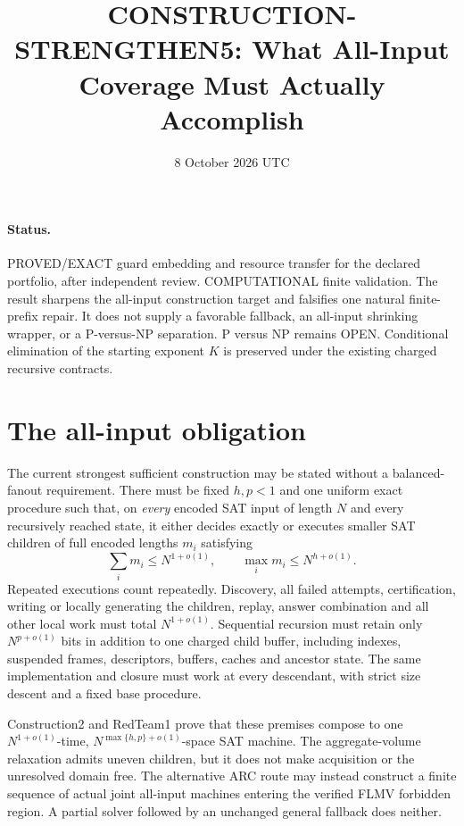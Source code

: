 \documentclass[11pt]{article}
\title{CONSTRUCTION-STRENGTHEN5: What All-Input Coverage Must Actually Accomplish}
\date{8 October 2026 UTC}
\begin{document}
\sloppy\maketitle

\paragraph{Status.}
PROVED/EXACT guard embedding and resource transfer for the declared
portfolio, after independent review. COMPUTATIONAL finite validation.
The result sharpens the all-input construction target and falsifies one
natural finite-prefix repair. It does not supply a favorable fallback,
an all-input shrinking wrapper, or a P-versus-NP separation. P versus NP
remains OPEN. Conditional elimination of the starting exponent $K$ is
preserved under the existing charged recursive contracts.

\section{The all-input obligation}
The current strongest sufficient construction may be stated without a
balanced-fanout requirement. There must be fixed $h,p<1$ and one uniform
exact procedure such that, on \emph{every} encoded SAT input of length
$N$ and every recursively reached state, it either decides exactly or
executes smaller SAT children of full encoded lengths $m_i$ satisfying
\[
 \sum_i m_i\le N^{1+o(1)},\qquad
 \max_i m_i\le N^{h+o(1)}.
 \tag{1}
\]
Repeated executions count repeatedly. Discovery, all failed attempts,
certification, writing or locally generating the children, replay,
answer combination and all other local work must total $N^{1+o(1)}$.
Sequential recursion must retain only $N^{p+o(1)}$ bits in addition to
one charged child buffer, including indexes, suspended frames, descriptors,
buffers, caches and ancestor state. The same implementation and closure
must work at every descendant, with strict size descent and a fixed base
procedure.

Construction2 and RedTeam1 prove that these premises compose to one
$N^{1+o(1)}$-time, $N^{\max\{h,p\}+o(1)}$-space SAT machine. The
aggregate-volume relaxation admits uneven children, but it does not make
acquisition or the unresolved domain free. The alternative ARC route may
instead construct a finite sequence of actual joint all-input machines
entering the verified FLMV forbidden region. A partial solver followed
by an unchanged general fallback does neither.
\end{document}
